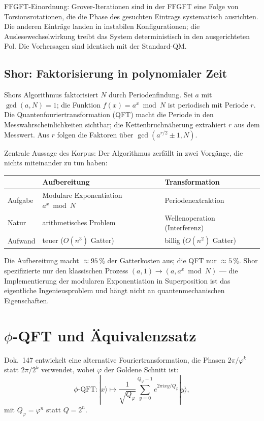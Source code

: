 FFGFT-Einordnung: Grover-Iterationen sind in der FFGFT eine Folge von
Torsionsrotationen, die die Phase des gesuchten Eintrags systematisch
ausrichten. Die anderen Einträge landen in instabilen Konfigurationen;
die Auslesewechselwirkung treibt das System deterministisch in den
ausgerichteten Pol. Die Vorhersagen sind identisch mit der
Standard-QM.

\subsection*{Shor: Faktorisierung in polynomialer Zeit}

Shors Algorithmus faktorisiert $N$ durch Periodenfindung. Sei $a$ mit
$\gcd(a,N) = 1$; die Funktion $f(x) = a^x\bmod N$ ist periodisch mit
Periode $r$. Die Quantenfouriertransformation (QFT) macht die Periode in
den Messwahrscheinlichkeiten sichtbar; die Kettenbruchnäherung extrahiert
$r$ aus dem Messwert. Aus $r$ folgen die Faktoren über $\gcd(a^{r/2}\pm1, N)$.

Zentrale Aussage des Korpus: Der Algorithmus zerfällt in zwei Vorgänge,
die nichts miteinander zu tun haben:

\begin{center}
\small
\begin{tabular}{p{2cm}p{3cm}p{3cm}}
\toprule
 & \textbf{Aufbereitung} & \textbf{Transformation} \\
\midrule
Aufgabe & Modulare Exponentiation $a^x\bmod N$ & Periodenextraktion \\
Natur & arithmetisches Problem & Wellenoperation (Interferenz) \\
Aufwand & teuer ($O(n^3)$ Gatter) & billig ($O(n^2)$ Gatter) \\
\bottomrule
\end{tabular}
\end{center}

Die Aufbereitung macht $\approx95\,\%$ der Gatterkosten aus; die QFT nur
$\approx5\,\%$. Shor spezifizierte nur den klassischen Prozess
$(a,1)\to(a,a^x\bmod N)$ --- die Implementierung der modularen
Exponentiation in Superposition ist das eigentliche Ingenieusproblem und
hängt nicht an quantenmechanischen Eigenschaften.

\section{$\phi$-QFT und Äquivalenzsatz}

Dok.~147 entwickelt eine alternative Fouriertransformation, die Phasen
$2\pi/\varphi^k$ statt $2\pi/2^k$ verwendet, wobei $\varphi$ der
Goldene Schnitt ist:
\begin{equation}
  \phi\text{-QFT}:|x\rangle\mapsto
  \frac{1}{\sqrt{Q_\varphi}}
  \sum_{y=0}^{Q_\varphi-1}e^{2\pi ixy/Q_\varphi}|y\rangle,
\end{equation}
mit $Q_\varphi = \varphi^n$ statt $Q = 2^n$.


